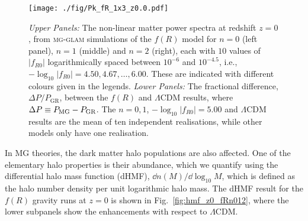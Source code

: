 \begin{figure}
    \centering 
    \texttt{[image: ./fig/Pk\_fR\_1x3\_z0.0.pdf]}
    \caption{\textit{Upper Panels:} The non-linear matter power spectra at redshift $z=0$, from \textsc{mg-glam} simulations of the $f(R)$ model for $n=0$ (left panel), $n=1$ (middle) and $n=2$ (right), each with $10$ values of $|f_{R0}|$ logarithmically spaced between $10^{-6}$ and $10^{-4.5}$, i.e., $-\log_{10}|f_{R0}| = 4.50, 4.67, \dots, 6.00$. These are indicated with different colours given in the legends. 
    \textit{Lower Panels:} The fractional difference, $\Delta P / P_{\mathrm{GR}}$, between the $f(R)$ and $\Lambda$CDM results, where $\Delta P \equiv P_{\rm MG} - P_{\rm GR}$. The $n=0,1$, $-\log_{10} |f_{R0}| = 5.00$ and $\Lambda$CDM results are the mean of ten independent realisations, while other models only have one realisation.}
    \label{fig:Pk_mm_z0_fRn012}
\end{figure}


 
In \ac{MG} theories, the dark matter halo populations are also affected. One of the elementary halo properties is their abundance, which we quantify using the differential halo mass function (dHMF), $\dd{n}(M)/\dd{\log_{10}M}$, which is defined as the halo number density per unit logarithmic halo mass.
The dHMF result for the $f(R)$ gravity runs at $z=0$ is shown in Fig.~\ref{fig:hmf_z0_fRn012}, where the lower subpanels show the enhancements with respect to $\Lambda$CDM.


